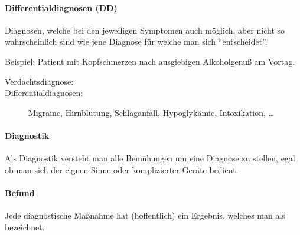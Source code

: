 \paragraph{Differentialdiagnosen (DD)} \index{} Diagnosen,
welche bei den jeweiligen Symptomen auch
möglich, aber nicht so wahrscheinlich sind wie jene
Diagnose für welche man sich ``entscheidet''.

Beispiel: Patient mit Kopfschmerzen nach ausgiebigen
Alkoholgenuß am Vortag.
\begin{description}
    \item[Verdachtsdiagnose:] 
    \item[Differentialdiagnosen:]
    Migraine, Hirnblutung, Schlaganfall,
    Hypoglykämie, Intoxikation, \ldots
\end{description}


\paragraph{Diagnostik}

Als Diagnostik versteht man alle Bemühungen um eine Diagnose zu stellen, egal
ob man sich der eignen Sinne oder komplizierter Geräte
bedient.

\paragraph{Befund}

Jede diagnostische Maßnahme hat (hoffentlich) ein Ergebnis, welches man als
 bezeichnet. 



\section{}

\section{}






